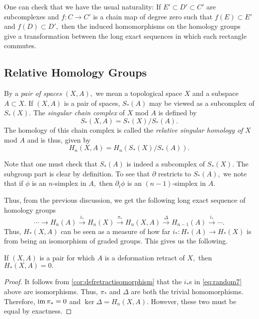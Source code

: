 \documentclass[12pt]{article}
\begin{document}
One can check that we have the usual naturality: If $E' \subset D' \subset C'$ are subcomplexes and $f:C \to C'$ is a chain map of degree zero such that $f(E) \subset E'$ and $f(D) \subset D',$ then the induced homomorphisms on the homology groups give a transformation between the long exact sequences in which each rectangle commutes.

\subsection{Relative Homology Groups}

\begin{defn}
	By a \emph{pair of spaces} $(X, A),$ we mean a topological space $X$ and a subspace $A \subset X.$ If $(X, A)$ is a pair of spaces, $S_*(A)$ may be viewed as a subcomplex of $S_*(X).$ The \emph{singular chain complex} of $X$ mod $A$ is defined by
	\begin{equation*} 
		S_*(X, A) = S_*(X)/S_*(A).
	\end{equation*}
	The homology of this chain complex is called the \emph{relative singular homology of} $X$ mod $A$ and is thus, given by
	\begin{equation*} 
		H_n(X, A) = H_n(S_*(X)/S_*(A)).
	\end{equation*} 
\end{defn}
Note that one must check that $S_*(A)$ is indeed a subcomplex of $S_*(X).$ The subgroup part is clear by definition. To see that $\partial$ restricts to $S_*(A),$ we note that if $\phi$ is an $n$-simplex in $A,$ then $\partial_i\phi$ is an $(n-1)$-simplex in $A.$

Thus, from the previous discussion, we get the following long exact sequence of homology groups
\begin{equation} \tag{$*$} \label{eq:random7}
	\cdots \to H_n(A) \overset{i_*}{\longrightarrow} H_n(X) \overset{\pi_*}{\longrightarrow} H_n(X, A) \overset{\Delta}{\longrightarrow} H_{n-1}(A) \overset{i_*}{\longrightarrow} \cdots.
\end{equation}
Thus, $H_*(X, A)$ can be seen as a measure of how far $i_*:H_*(A) \to H_*(X)$ is from being an isomorphism of graded groups. This gives us the following.

\begin{prop}
	If $(X, A)$ is a pair for which $A$ is a deformation retract of $X,$ then $H_*(X, A) = 0.$
\end{prop}
\begin{proof} 
	It follows from \cref{cor:defretractisomorphism} that the $i_*$s in \cref{eq:random7} above are isomorphisms. Thus, $\pi_*$ and $\Delta$ are both the trivial homomorphisms. Therefore, $\operatorname{im}\pi_* = 0$ and $\ker\Delta = H_n(X, A).$ However, these two must be equal by exactness.
\end{proof}
\end{document}
